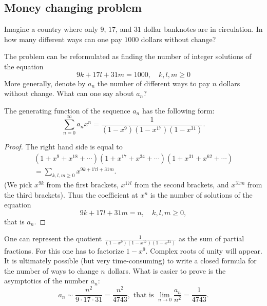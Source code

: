 \begin{page}
\setcounter{section}{3}
\setcounter{subsection}{1}
\setcounter{dfn}{0}
\label{portion:780}

\subsection{Money changing problem}
Imagine a country where only $9$, $17$, and $31$ dollar banknotes are in circulation.
In how many different ways can one pay $1000$ dollars without change?

The problem can be reformulated as finding the number of integer solutions of the equation
\[
9k + 17l + 31m = 1000, \quad k, l, m \ge 0
\]
More generally, denote by $a_n$ the number of different ways to pay $n$ dollars without change.
What can one say about $a_n$?


\end{page}

\begin{page}
\setcounter{section}{3}
\setcounter{subsection}{1}
\setcounter{dfn}{1}
\label{portion:782}

\begin{thm}
\label{thm:Dollars}
The generating function of the sequence $a_n$ has the following form:
\[
\sum_{n=0}^\infty a_n x^n = \frac{1}{(1-x^9)(1-x^{17})(1-x^{31})}.
\]
\end{thm}

\end{page}

\begin{page}
\setcounter{section}{3}
\setcounter{subsection}{2}
\setcounter{dfn}{1}
\label{portion:783}

\begin{proof}
The right hand side is equal to
\begin{multline*}
(1 + x^9 + x^{18} + \cdots)(1 + x^{17} + x^{34} + \cdots)(1 + x^{31} + x^{62} + \cdots)\\
= \sum_{k,l,m\ge 0} x^{9k+17l+31m}.
\end{multline*}
(We pick $x^{9k}$ from the first brackets, $x^{17l}$ from the second brackets, and $x^{31m}$ from the third brackets).
Thus the coefficient at $x^n$ is the number of solutions of the equation
\[
9k + 17l + 31m = n, \quad k, l, m \ge 0,
\]
that is $a_n$.
\end{proof}

One can represent the quotient $\frac{1}{(1-x^9)(1-x^{17})(1-x^{31})}$ as the sum of partial fractions.
For this one has to factorize $1-x^9$.
Complex roots of unity will appear.
It is ultimately possible (but very time-consuming) to write a closed formula for the number of ways to change $n$ dollars.
What is easier to prove is the asymptotics of the number $a_n$:
\[
a_n \sim \frac{n^2}{9 \cdot 17 \cdot 31} = \frac{n^2}{4743}, \text{ that is } \lim_{n \to 0} \frac{a_n}{n^2} = \frac{1}{4743}.
\]





\end{page}

